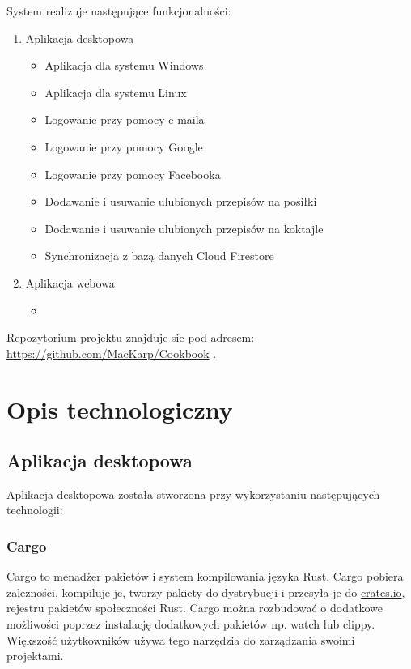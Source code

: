 \documentclass[12pt,a4paper]{article}
\begin{document}
		\indent System realizuje następujące funkcjonalności:
		\begin{enumerate}
			\item Aplikacja desktopowa
			\begin{itemize}
				\item Aplikacja dla systemu Windows
				\item Aplikacja dla systemu Linux
				\item Logowanie przy pomocy e-maila
				\item Logowanie przy pomocy Google
				\item Logowanie przy pomocy Facebooka
				\item Dodawanie i usuwanie ulubionych przepisów na posiłki
				\item Dodawanie i usuwanie ulubionych przepisów na koktajle
				\item Synchronizacja z bazą danych Cloud Firestore
			\end{itemize}
					\item Aplikacja webowa
			\begin{itemize}
				\item
			\end{itemize}
		\end{enumerate}
		
		\indent Repozytorium projektu znajduje sie pod adresem: \url{https://github.com/MacKarp/Cookbook} .
	\newpage
	
	\section{Opis technologiczny}
		\subsection{Aplikacja desktopowa}
			
			\indent Aplikacja desktopowa została stworzona przy wykorzystaniu następujących technologii:
				\subsubsection{Cargo}

					\indent Cargo to menadżer pakietów i system kompilowania języka Rust. Cargo pobiera zależności, kompiluje je, tworzy pakiety do dystrybucji i przesyła je do
					\url{crates.io}, rejestru pakietów społeczności Rust. Cargo można rozbudować o dodatkowe możliwości poprzez instalację dodatkowych pakietów np. watch lub clippy. Większość
					użytkowników używa tego narzędzia do zarządzania swoimi projektami. 
\end{document}
